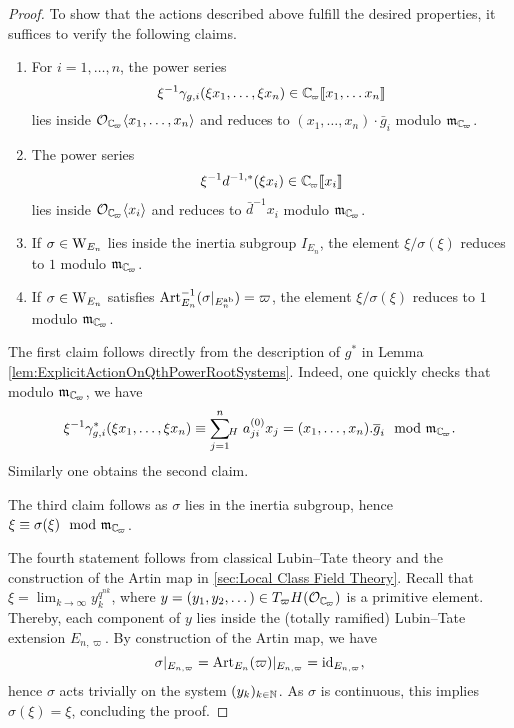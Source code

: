 \documentclass[../main.tex]{subfiles}
\begin{document}
\begin{proof}
To show that the actions described above fulfill the desired properties, it suffices
to verify the following claims.
\begin{enumerate}
  \item For $i = 1, \dots, n$, the power series 
    $$\xi^{-1}\gamma_{g,i}(\xi x_1, \dots, \xi x_n) \in \Cp\llbr x_1, \dots x_n \rrbr$$
    lies inside $\cO_\Cp \langle x_1, \dots, x_n \rangle$ and reduces to $(x_1,
    \dots, x_n)\cdot \bar g_i$ modulo $\fm_\Cp$.
  \item The power series 
    \begin{equation*}
      \xi^{-1} d^{-1, *} (\xi x_i) \in \Cp \llbr x_i\rrbr 
    \end{equation*}
    lies inside $\cO_\Cp \langle x_i \rangle$ and reduces to $\bar d^{-1} x_i$
    modulo $\fm_\Cp$. 
  \item If $\sigma \in \mathrm W_{E_n}$ lies inside the inertia subgroup $I_{E_n}$,
    the element
    $\xi/\sigma(\xi)$ reduces to $1$ modulo $\fm_\Cp$.
  \item If $\sigma \in \mathrm W_{E_n}$ satisfies $\mathrm{Art}^{-1}_{E_n}(\sigma|_{E_n^{\mathrm{ab}}}) 
    = \varpi$, the element $\xi/\sigma(\xi)$ reduces to $1$ modulo $\fm_\Cp$. 
\end{enumerate}
The first claim follows directly from the description of $g^*$ in
Lemma \ref{lem:ExplicitActionOnQthPowerRootSystems}. Indeed, one quickly checks
that modulo $\fm_\Cp$, we have 
$$\xi^{-1} \gamma_{g,i}^*(\xi x_1, \dots, \xi x_n) \equiv \sum_{j=1}^n \sumH
a_{ji}^{(0)} x_j = (x_1, \dots, x_n).\bar g_i \mod \fm_\Cp.$$ 
Similarly one obtains the second claim.

The third claim follows as $\sigma$ lies in the inertia subgroup,
hence $\xi \equiv \sigma(\xi) \mod \fm_\Cp$.

The fourth statement follows from classical Lubin--Tate theory and the construction
of the Artin map in \cref{sec:Local Class Field Theory}. 
Recall that $\xi = \lim_{k \to \infty} y_k^{q^{nk}}$, where $y =(y_1, y_2, \dots) 
\in T_\varpi H(\cO_\Cp)$ is a primitive element.
Thereby, each component of $y$ lies inside the (totally ramified) Lubin--Tate
extension $E_{n,\varpi}$. By construction of the Artin map,
we have
$$\sigma|_{E_{n,\varpi}} = \mathrm{Art}_{E_{n}}(\varpi)|_{E_{n, \varpi}} =  \operatorname{id}_{E_{n,\varpi}},$$
hence $\sigma$ acts trivially on
the system $(y_k)_{k\in \mathbb{N}}$. As $\sigma$ is continuous, this implies
$\sigma(\xi) = \xi$, concluding the proof.
\end{proof}
\end{document}
